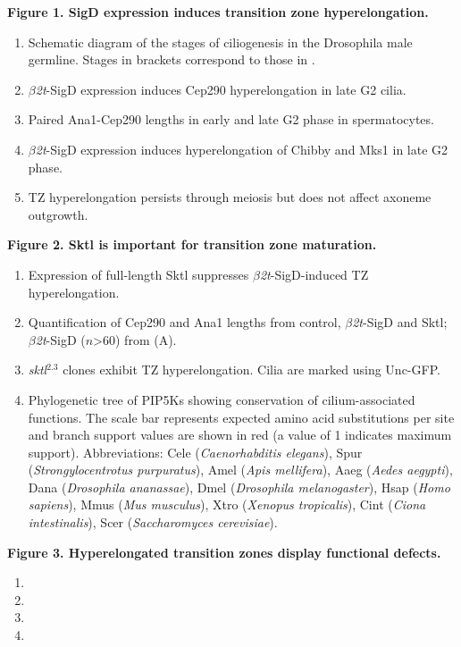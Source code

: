 \documentclass[12pt, twoside, letterpaper]{article}
\newcommand{\sigd}{$\beta$\textit{2t}-SigD}
\begin{document}
\begin{doublespacing}
\begin{linenumbers}
    \textbf{Figure 1. SigD expression induces transition zone hyperelongation.}
    \begin{enumerate}[label={(\Alph*)}, nolistsep]
    \item Schematic diagram of the stages of ciliogenesis in the Drosophila male germline.
      Stages in brackets correspond to those in \citep{cenci1994chromatin}.
    \item \sigd{} expression induces Cep290 hyperelongation in late G2 cilia.
    \item Paired Ana1-Cep290 lengths in early and late G2 phase in spermatocytes.
    \item \sigd{} expression induces hyperelongation of Chibby and Mks1 in late G2 phase.
    \item TZ hyperelongation persists through meiosis but does not affect
      axoneme outgrowth.
    \end{enumerate}
    
    \textbf{Figure 2. Sktl is important for transition zone maturation.}
    \begin{enumerate}[label={(\Alph*)}, nolistsep]
    \item Expression of full-length Sktl suppresses \sigd{}-induced TZ hyperelongation.
    \item Quantification of Cep290 and Ana1 lengths from control, \sigd{} and Sktl; \sigd{} ($n$\textgreater 60) from (A).
    \item \textit{sktl}$^{2.3}$ clones exhibit TZ hyperelongation. Cilia are marked using
      Unc-GFP.
    \item Phylogenetic tree of PIP5Ks showing conservation of cilium-associated functions.
      The scale bar represents expected amino acid substitutions per site and branch support values are shown in red (a value of 1 indicates maximum support).
      Abbreviations: Cele (\textit{Caenorhabditis elegans}), Spur (\textit{Strongylocentrotus purpuratus}), Amel (\textit{Apis mellifera}), Aaeg (\textit{Aedes aegypti}), Dana (\textit{Drosophila ananassae}), Dmel (\textit{Drosophila melanogaster}), Hsap (\textit{Homo sapiens}), Mmus (\textit{Mus musculus}), Xtro (\textit{Xenopus tropicalis}), Cint (\textit{Ciona intestinalis}), Scer (\textit{Saccharomyces cerevisiae}).
    \end{enumerate}
    
    
    \textbf{Figure 3. Hyperelongated transition zones display functional defects.}
    \begin{enumerate}[label={(\Alph*)}, nolistsep]
    \item 
    \item
    \item
    \item
    \end{enumerate}



\end{linenumbers}
\end{doublespacing}
\end{document}
